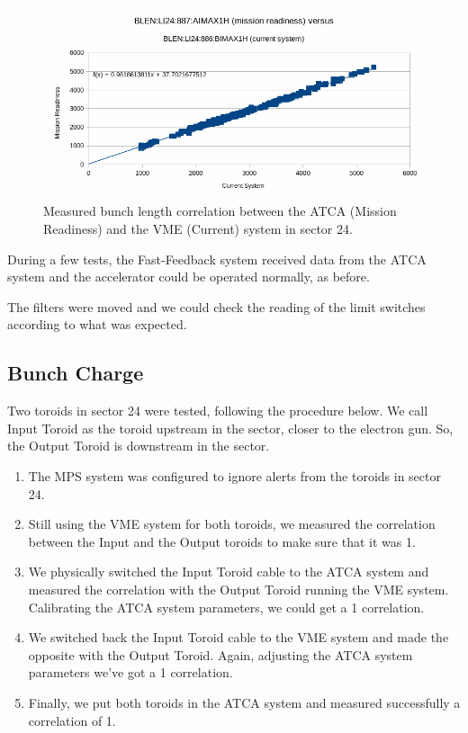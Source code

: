 \documentclass[letter,
        biblatex,   %
        keeplastbox,  %
        ]{jacow}
\begin{document}
\begin{figure}[!htb]
  \centering
  \includegraphics*[width=\columnwidth]{blen_result}
  \caption{Measured bunch length correlation between the ATCA (Mission Readiness) and the VME (Current) system in sector 24.}
  \label{fig:blen_result}
\end{figure}

During a few tests, the Fast-Feedback system received data from the ATCA system and the accelerator could be operated normally, as before.

The filters were moved and we could check the reading of the limit switches according to what was expected.

\subsection{Bunch Charge}
Two toroids in sector 24 were tested, following the procedure below. We call Input Toroid as the toroid upstream in the sector, closer to the electron gun. So, the Output Toroid is downstream in the sector.

\begin{enumerate}
  \item The MPS system was configured to ignore alerts from the toroids in sector 24.
  \item Still using the VME system for both toroids, we measured the correlation between the Input and the Output toroids to make sure that it was 1.
  \item We physically switched the Input Toroid cable to the ATCA system and measured the correlation with the Output Toroid running the VME system. Calibrating the ATCA system parameters, we could get a 1 correlation.
  \item We switched back the Input Toroid cable to the VME system and made the opposite with the Output Toroid. Again, adjusting the ATCA system parameters we've got a 1 correlation.
  \item Finally, we put both toroids in the ATCA system and measured successfully a correlation of 1.
\end{enumerate}
\end{document}
